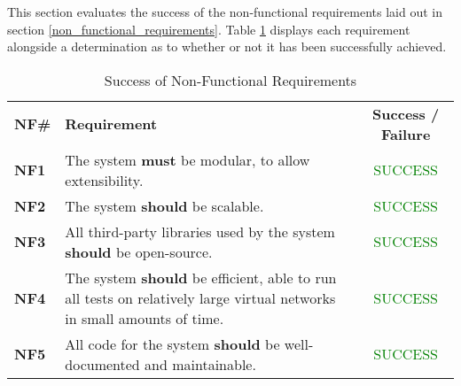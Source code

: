 
This section evaluates the success of the non-functional requirements laid out in section \ref{non_functional_requirements}. Table \ref{evaluation_non_functional_requirements_table} displays each requirement alongside a determination as to whether or not it has been successfully achieved.

\begin{center}
  \begin{longtable}{|l|p{9cm}|c|}
    \caption{Success of Non-Functional Requirements} \\ \hline
    \label{evaluation_non_functional_requirements_table}
    \textbf{NF\#} & \textbf{Requirement} & \textbf{Success / Failure} \\ \thickhline
    \textbf{NF1} & The system \textbf{must} be modular, to allow extensibility. & \textcolor{green}{SUCCESS} \\ \hline
    \textbf{NF2} & The system \textbf{should} be scalable. & \textcolor{green}{SUCCESS} \\ \hline
    \textbf{NF3} & All third-party libraries used by the system \textbf{should} be open-source. & \textcolor{green}{SUCCESS} \\ \hline
    \textbf{NF4} & The system \textbf{should} be efficient, able to run all tests on relatively large virtual networks in small amounts of time. & \textcolor{green}{SUCCESS} \\ \hline
    \textbf{NF5} & All code for the system \textbf{should} be well-documented and maintainable. & \textcolor{green}{SUCCESS} \\ \hline
  \end{longtable}
\end{center}
